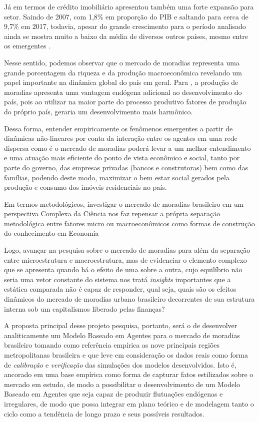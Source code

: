 Já em termos de crédito imobiliário apresentou também uma forte expansão para setor. Saindo de 2007, com 1,8\% em proporção do PIB e saltando para cerca de 9,7\% em 2017, todavia, apesar do grande crescimento para o período analisado ainda se mostra muito a baixo da média de diversos outros países, mesmo entre os emergentes \cite{Cerutti2017, Otto2015}.

Nesse sentido, podemos observar que o mercado de moradias representa uma grande porcentagem da riqueza e da produção macroeconômica revelando um papel importante na dinâmica global do país em geral. Para , a produção de moradias apresenta uma vantagem endógena adicional ao desenvolvimento do país, pois ao utilizar na maior parte do processo produtivo fatores de produção do próprio país, geraria um desenvolvimento mais harmônico.


Dessa forma, entender empiricamente os fenômenos emergentes a partir de dinâmicas não-lineares por conta da interação entre os agentes em uma rede dispersa como é o mercado de moradias poderá levar a um melhor entendimento e uma atuação mais eficiente do ponto de vista econômico e social, tanto por parte do governo, das empresas privadas (bancos e construtoras) bem como das famílias, podendo deste modo, maximizar o bem estar social gerados pela produção e consumo dos imóveis residenciais no país.

Em termos metodológicos, investigar o mercado de moradias brasileiro em um perspectiva Complexa da Ciência nos faz repensar a própria separação metodológica entre fatores micro ou macroeconômicos como formas de construção do conhecimento em Economia \cite{Berghgowdy2003, DurantonPuga2004}

Logo, avançar na pesquisa sobre o mercado de moradias para além da separação entre microestrutura e macroestrutura, mas de evidenciar o elemento complexo que se apresenta quando há o efeito de uma sobre a outra, cujo equilíbrio não seria uma vetor constante do sistema nos tratá \textit{insights} importantes que a estática comparada não é capaz de responder, qual seja, quais são os efeitos dinâmicos do mercado de moradias urbano brasileiro decorrentes de sua estrutura interna sob um capitalismos liberado pelas finanças?

A proposta principal desse projeto pesquisa, portanto, será o de desenvolver analiticamente um Modelo Baseado em Agentes para o mercado de moradias brasileiro tomando como referência empírica as nove principais regiões metropolitanas brasileira e que leve em consideração os dados reais como forma de \textit{calibração} e \textit{verificação} das simulações dos modelos desenvolvidos.  Isto é, ancorado em uma base empírica como forma de capturar fatos estilizados sobre o mercado em estudo, de modo a possibilitar o desenvolvimento de um Modelo Baseado em Agentes que seja capaz de produzir flutuações endógenas e irregulares, de modo que possa integrar em plano teórico e de modelagem tanto o ciclo como a tendência de longo prazo e seus possíveis resultados.






